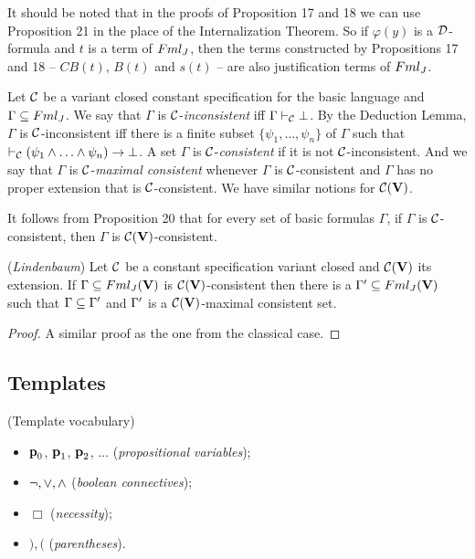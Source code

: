 \qquad It should be noted that in the proofs of Proposition 17 and 18 we can use Proposition 21 in the place of the Internalization Theorem. So if $\varphi(y)$ is a $\mathcal{D}$-formula and $t$ is a term of $Fml_{J}$, then the terms constructed by Propositions 17 and 18 -- $CB(t)$, $B(t)$ and $s(t)$ -- are also justification terms of $Fml_{J}$.





\begin{defn}
	Let $\mathcal{C}$ be a variant closed constant specification for the basic language and $\Gamma \subseteq Fml_{J}$. We say that $\Gamma$ is $\mathcal{C}$-\textit{inconsistent} iff $\Gamma \vdash_{\mathcal{C}} \bot$. By the Deduction Lemma, 
	$\Gamma$ is $\mathcal{C}$-inconsistent iff there is a finite subset $\{\psi_{1}, \dots, \psi_{n}\}$ of $\Gamma$ such that $\teo_{\C} (\psi_{1} \e \dots \e \psi_{n}) \impli \bot$. A set $\Gamma$ is $\mathcal{C}$-\textit{consistent} if it is not $\mathcal{C}$-inconsistent. And we say that $\Gamma$ is $\mathcal{C}$-\textit{maximal consistent} whenever $\Gamma$ is $\mathcal{C}$-consistent and $\Gamma$ has no proper extension that is $\mathcal{C}$-consistent. We have similar notions for $\mathcal{C}(\textbf{V})$.
\end{defn}

\qquad It follows from Proposition 20 that for every set of basic formulas $\Gamma$, if $\Gamma$ is $\mathcal{C}$-consistent, then $\Gamma$ is $\mathcal{C}(\textbf{V})$-consistent.



\begin{pro}
	(\textit{Lindenbaum})  Let $\mathcal{C}$ be a constant specification variant closed and $\mathcal{C}(\textbf{V})$ its extension. If $\Gamma \subseteq Fml_{J}(\textbf{V})$ is $\mathcal{C}(\textbf{V})$-consistent then there is a $\Gamma^{\prime} \subseteq Fml_{J}(\textbf{V})$ such
	that $\Gamma \subseteq \Gamma^{\prime}$ and $\Gamma^{\prime}$ is a $\mathcal{C}(\textbf{V})$-maximal consistent set.
\end{pro}

\begin{proof}
	A similar proof as the one from the classical case.
\end{proof}


\subsection{Templates}


\begin{defn} (Template vocabulary)    
	\begin{itemize} 
		\item $\textbf{p}_{0}$, $\textbf{p}_{1}$, $\textbf{p}_{2}$, $\dots$ (\textit{propositional variables});
		\item $\neg, \vee, \wedge $ (\textit{boolean connectives});
		\item $\Box$ (\textit{necessity});
		\item $),($ (\textit{parentheses}).
	\end{itemize}
\end{defn}



